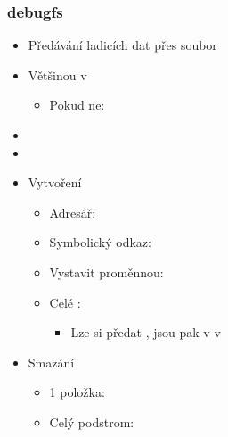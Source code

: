 \begin{frame}
  \frametitle{debugfs}

  \begin{itemize}
    \item Předávání ladicích dat přes soubor

    \item Většinou v 
    \begin{itemize}
      \item Pokud ne: 
    \end{itemize}

    \item {}
    \item {}

    \item Vytvoření
    \begin{itemize}
      \item Adresář: 
      \item Symbolický odkaz: 
      \item Vystavit proměnnou: 

      \pause

      \item Celé : 
      \begin{itemize}
	\item Lze si předat , jsou pak v  v
      \end{itemize}
    \end{itemize}

    \pause

    \item Smazání
    \begin{itemize}
      \item 1 položka: 
      \item Celý podstrom: 
    \end{itemize}
  \end{itemize}

\end{frame}

